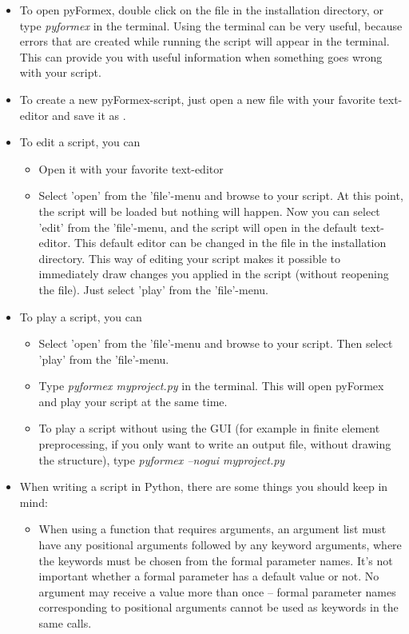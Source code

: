 \documentclass[a4paper]{manual}
\newcommand{\pyformex}{pyFormex\xspace}
\begin{document}
{\begin{itemize}
\item To open \pyformex, double click on the file  in the installation directory, or type \emph{pyformex} in the terminal. Using the terminal can be very useful, because errors that are created while running the script will appear in the terminal. This can provide you with useful information when something goes wrong with your script.
\item To create a new \pyformex-script, just open a new file with your favorite text-editor and save it as .
\item To edit a script, you can
	\begin{itemize}
	\item Open it with your favorite text-editor
	\item Select 'open' from the 'file'-menu and browse to your script. At this point, the script will be loaded but nothing will 		happen. Now you can select 'edit' from the 'file'-menu, and the script will open in the default text-editor. This default editor 		can be changed in the file  in the installation directory.
	This way of editing your script makes it possible to immediately draw changes you applied in the script (without reopening 		the file).  Just select 'play' from the 'file'-menu.
	\end{itemize}
\item To play a script, you can
	\begin{itemize}
	\item Select 'open' from the 'file'-menu and browse to your script. Then select 'play' from the 'file'-menu.
	\item Type \emph{pyformex myproject.py} in the terminal. This will open \pyformex and play your script at the same time.
	\item To play a script without using the GUI (for example in finite element preprocessing, if you only want to write an 		output file, without drawing the structure), type \emph{pyformex --nogui myproject.py}
	\end{itemize}
\item When writing a script in Python, there are some things you should keep in mind:
	\begin{itemize}
	\item When using a function that requires arguments, an argument list must have any positional arguments followed by any keyword arguments, where the keywords must be chosen from the formal parameter names. It's not important whether a formal parameter has a default value or not. No argument may receive a value more than once -- formal parameter names corresponding to positional arguments cannot be used as keywords in the same calls. 

\end{itemize}
\end{itemize}}
\end{document}
